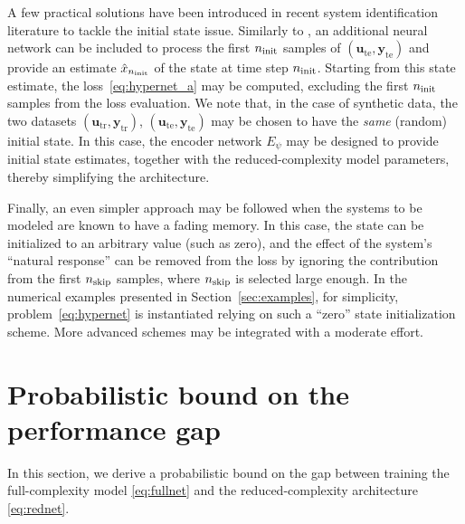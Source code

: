 \documentclass{article}
\newcommand{\tr}{\mathrm{tr}}
\newcommand{\te}{\mathrm{te}}
\newcommand{\seq}[1]{{\mathbf{#1}}}
\newcommand{\encpar}{\psi}
\begin{document}
A few practical solutions have been introduced in recent system identification literature to tackle the initial state issue. Similarly to \cite{beintema2023deep,Bem25}, an additional neural network can be included to process  the first $n_{\rm init}$ samples of $(\seq u_\te , \seq y_\te )$ and provide an estimate $\hat x_{n_{\rm init}}$ of the state at time step $n_{\rm init}$. Starting from this state estimate, the loss~\eqref{eq:hypernet_a} may be computed, excluding the first $n_{\rm init}$ samples from the loss evaluation. We note that, in the case of synthetic data, the two datasets $(\seq u_\tr , \seq y_\tr )$, $(\seq u_\te , \seq y_\te )$ may be chosen to have the \emph{same} (random) initial state. In this case, the encoder network $E_\encpar$ may be designed to provide initial state estimates, together with the reduced-complexity model parameters, thereby simplifying the architecture.

Finally, an even simpler approach may be followed when the systems to be modeled are known to have a fading memory. In this case, the state can be initialized to an arbitrary value (such as zero), and the effect of the system's ``natural response'' can be removed from the loss by ignoring the contribution from the first $n_{\rm skip}$ samples, where $n_{\rm skip}$ is selected large enough. In the numerical examples presented in Section~\ref{sec:examples}, for simplicity, problem~\eqref{eq:hypernet} is instantiated relying on such a ``zero'' state initialization scheme. More advanced schemes may be integrated with a moderate effort.

\section{Probabilistic bound on the performance gap} \label{sec:prob_bounds}

In this section, we derive a probabilistic bound on the gap between training the full-complexity model \eqref{eq:fullnet}
and the reduced-complexity architecture \eqref{eq:rednet}.
\end{document}

